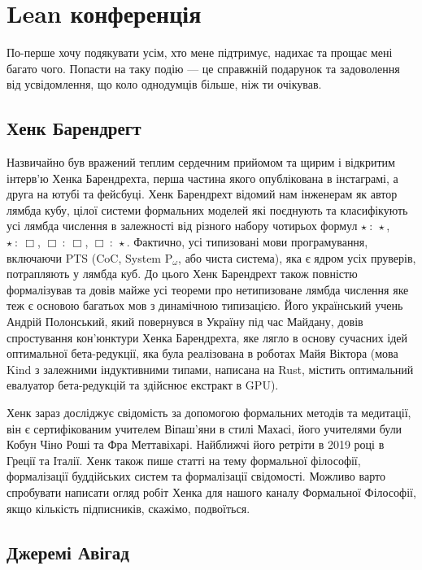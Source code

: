 \section{Lean конференція}

По-перше хочу подякувати усім, хто мене підтримує, надихає та
прощає мені багато чого. Попасти на таку подію --- це справжній
подарунок та задоволення від усвідомлення, що коло однодумців
більше, ніж ти очікував.

\subsection*{Хенк Барендрегт}

 Назвичайно був вражений теплим сердечним
прийомом та щирим і відкритим інтерв'ю Хенка Барендрехта, перша
частина якого опублікована в інстаграмі, а друга на ютубі та
фейсбуці. Хенк Барендрехт відомий нам інженерам як автор лямбда
кубу, цілої системи формальних моделей які поєднують та класифікують
усі лямбда числення в залежності від різного набору чотирьох
формул $\star\ :\ \star$, $\star\ :\ \Box$, $\Box\ :\ \Box$,
$\Box\ :\ \star$. Фактично, усі типизовані мови програмування,
включаючи PTS (CoC, System P$_\omega$, або чиста система), яка
є ядром усіх пруверів, потрапляють у лямбда куб. До цього Хенк
Барендрехт також повністю формалізував та довів майже усі теореми
про нетипизоване лямбда числення яке теж є основою багатьох мов
з динамічною типизацією. Його український учень Андрій Полонський,
який повернувся в Україну під час Майдану, довів спростування
кон'юнктури Хенка Барендрехта, яке лягло в основу сучасних ідей
оптимальної бета-редукції, яка була реалізована в роботах Майя
Віктора (мова Kind з залежними індуктивними типами, написана
на Rust, містить оптимальний евалуатор бета-редукцій
та здійснює екстракт в GPU).

Хенк зараз досліджує свідомість за допомогою формальних методів
та медитації, він є сертифікованим учителем Віпаш'яни в стилі
Махасі, його учителями були Кобун Чіно Роші та Фра Меттавіхарі.
Найближчі його ретріти в 2019 році в Греції та Італії. Хенк також
пише статті на тему формальної філософії, формалізації буддійських
систем та формалізації свідомості. Можливо варто спробувати написати
огляд робіт Хенка для нашого каналу Формальної Філософії, якщо
кількість підписників, скажімо, подвоїться.

\subsection*{Джеремі Авігад}

